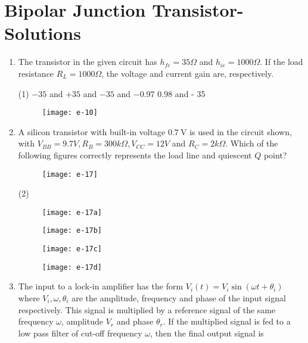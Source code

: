 \chapter{Bipolar Junction Transistor-Solutions}
\begin{enumerate}
	\item The transistor in the given circuit has $h_{f e}=35 \Omega$ and $h_{i e}=1000 \Omega$. If the load resistance $R_{L}=1000 \Omega$, the voltage and current gain are, respectively.
	{	}
	\begin{tasks}(1)
		\task[\textbf{A.}] $-35$ and $+35$
		 and $-35$
		 and $-0.97$
		\task[\textbf{D.}]  $0.98$ and - 35
	\end{tasks}
	\begin{figure}[H]
		\centering
		\texttt{[image: e-10]}
	\end{figure}
	\item A silicon transistor with built-in voltage $0.7 \mathrm{~V}$ is used in the circuit shown, with $V_{B B}=9.7 V, R_{B}=300 k \Omega, V_{C C}=12 V$ and $R_{C}=2 k \Omega$. Which of the following figures correctly represents the load line and quiescent $Q$ point?
	{	}
	\begin{figure}[H]
		\centering
		\texttt{[image: e-17]}
	\end{figure}
	\begin{tasks}(2)
		\task[\textbf{A.}] \begin{figure}[H]
			\centering
			\texttt{[image: e-17a]}
		\end{figure}
		\task[\textbf{B.}] \begin{figure}[H]
			\centering
			\texttt{[image: e-17b]}
		\end{figure}
		\task[\textbf{C.}] \begin{figure}[H]
			\centering
			\texttt{[image: e-17c]}
		\end{figure}
		\task[\textbf{D.}] \begin{figure}[H]
			\centering
			\texttt{[image: e-17d]}
		\end{figure}
	\end{tasks}
	\item The input to a lock-in amplifier has the form $V_{i}(t)=V_{i} \sin \left(\omega t+\theta_{i}\right)$ where $V_{i}, \omega, \theta_{i}$ are the amplitude, frequency and phase of the input signal respectively. This signal is multiplied by a reference signal of the same frequency $\omega$, amplitude $V_{r}$ and phase $\theta_{r}$. If the multiplied signal is fed to a low pass filter of cut-off frequency $\omega$, then the final output signal is

\end{enumerate}
